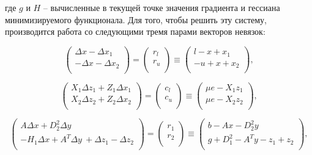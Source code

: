 \documentclass[a4paper, 12pt, titlepage]{article}
\theoremstyle{definition}
\theoremstyle{plain}
\theoremstyle{plain}
\begin{document}
где $g$ и $H$ -- вычисленные в текущей точке значения градиента и гессиана
минимизируемого функционала. Для того, чтобы решить эту систему, производится 
работа со следующими тремя парами векторов невязок:

\begin{equation}
 \label{eq:newton1}
 \left(
  \begin{array}{c}
   \Delta x - \Delta x_{1} \\
   - \Delta x - \Delta x_{2} \\
   \end{array}
 \right) =
 \left(
  \begin{array}{c}
   r_{l} \\
   r_{u} \\
   \end{array}
 \right) \equiv
 \left(
  \begin{array}{c}
   l - x + x_{1} \\
   -u + x + x_{2} \\
   \end{array}
 \right),
\end{equation}

\begin{equation}
\label{eq:newton2}
 \left(
  \begin{array}{c}
   X_{1} \Delta z_{1} + Z_{1} \Delta x_{1} \\
   X_{2} \Delta z_{2} + Z_{2} \Delta x_{2} \\
   \end{array}
 \right) =
 \left(
  \begin{array}{c}
   c_{l} \\
   c_{u} \\
   \end{array}
 \right) \equiv
 \left(
  \begin{array}{c}
   \mu e - X_{1} z_{1} \\
   \mu e - X_{2} z_{2} \\
   \end{array}
 \right),
\end{equation}

\begin{equation}
\label{eq:newton3}
 \left(
  \begin{array}{c}
   A \Delta x + D_{2}^{2} \Delta y \\
   -H_{1} \Delta x + A^{T} \Delta y\ + \Delta z_{1} - \Delta z_{2} \\
   \end{array}
 \right) =
 \left(
  \begin{array}{c}
   r_{1} \\
   r_{2} \\
   \end{array}
 \right) \equiv
 \left(
  \begin{array}{c}
   b - A x - D_{2}^{2} y \\
   g + D_{1}^{2} - A^{T} y - z_{1} + z_{2} \\
   \end{array}
 \right),
\end{equation}
\end{document}
